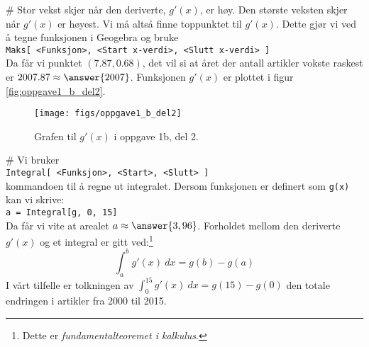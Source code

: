 \begin{easylist}[enumerate]
	# Stor vekst skjer når den deriverte, $g'(x)$, er høy.
	Den største veksten skjer når $g'(x)$ er høyest. 
	Vi må altså finne toppunktet til $g'(x)$.
	Dette gjør vi ved å tegne funksjonen i Geogebra og bruke \\
	\texttt{Maks[ <Funksjon>, <Start x-verdi>, <Slutt x-verdi> ]}\\ 
	Da får vi punktet $(7.87, 0.68)$, det vil si at året der antall artikler vokste raskest er $2007.87 \approx \answer{2007}$. Funksjonen $g'(x)$ er plottet i figur \eqref{fig:oppgave1_b_del2}.
	\begin{figure}[th!]
		\centering
		\texttt{[image: figs/oppgave1\_b\_del2]}
		\caption{Grafen til $g'(x)$ i oppgave 1b, del 2.}
		\label{fig:oppgave1_b_del2}
	\end{figure}

	# Vi bruker \\
	\texttt{Integral[ <Funksjon>, <Start>, <Slutt> ]}\\
	kommandoen til å regne ut integralet. Dersom funksjonen er definert som \texttt{g(x)} kan vi skrive: \\
	\texttt{a = Integral[g, 0, 15]} \\
	Da får vi vite at arealet $a \approx \answer{3,96}$. Forholdet mellom den deriverte $g'(x)$ og et integral er gitt ved:\footnote{Dette er \emph{fundamentalteoremet i kalkulus}.}
	\begin{equation*}
		\int_{a}^{b} g'(x) \ dx = g(b) - g(a)
	\end{equation*}
	I vårt tilfelle er tolkningen av $\int_{0}^{15} g'(x) \ dx = g(15) - g(0)$ den totale endringen i artikler fra 2000 til 2015.
	


\end{easylist}

